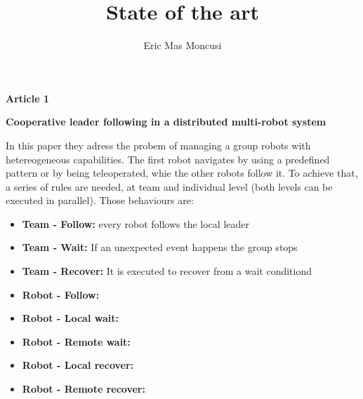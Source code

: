 \documentclass{article}
\title{State of the art}
\author{Eric Mas Moncusi}
\date{}
\begin{document}
\maketitle
\begin{center}
\textbf{\Large Article 1}

\textbf{\Large }

\textbf{\large Cooperative leader following in a distributed multi-robot system}
\end{center}


In this paper they adress the probem of managing a group robots with hetereogeneous capabilities. The first robot navigates by using a predefined pattern or by being teleoperated, whie the other robots follow it. To achieve that, a series of rules are needed, at team and individual level (both levels can be executed in parallel). Those behaviours are:
\begin{itemize}
	\item \textbf{Team - Follow:} every robot follows the local leader
	\item \textbf{Team - Wait:} If an unexpected event happens the group stops
	\item \textbf{Team - Recover:} It is executed to recover from a wait conditiond
	\item \textbf{Robot - Follow:}
	\item \textbf{Robot - Local wait:}
	\item \textbf{Robot - Remote wait:}
	\item \textbf{Robot - Local recover:}
	\item \textbf{Robot - Remote recover:}
\end{itemize}
\end{document}
